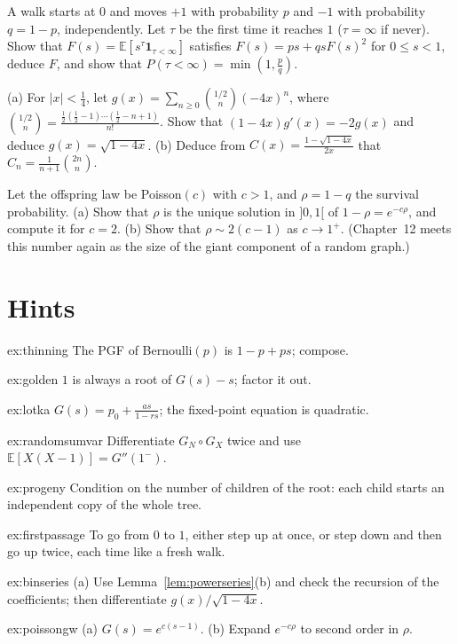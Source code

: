 \begin{exercise}[$\star\star$]\label{ex:firstpassage}
A walk starts at $0$ and moves $+1$ with probability $p$ and $-1$ with probability $q=1-p$, independently. Let $\tau$ be the
first time it reaches $1$ ($\tau=\infty$ if never). Show that $F(s)=\mathbb E[s^\tau\mathbf 1_{\tau<\infty}]$ satisfies $F(s)=ps+qsF(s)^2$ for
$0\le s<1$, deduce $F$, and show that $P(\tau<\infty)=\min(1,\frac pq)$.
\end{exercise}

\begin{exercise}[$\star\star$]\label{ex:binseries}
(a) For $|x|<\frac14$, let $g(x)=\sum_{n\ge0}\binom{1/2}n(-4x)^n$, where $\binom{1/2}n=\frac{\frac12(\frac12-1)\cdots(\frac12-n+1)}{n!}$. Show that
$(1-4x)g'(x)=-2g(x)$ and deduce $g(x)=\sqrt{1-4x}$. (b) Deduce from $C(x)=\frac{1-\sqrt{1-4x}}{2x}$ that $C_n=\frac1{n+1}\binom{2n}n$.
\end{exercise}

\begin{exercise}[$\star\star\star$]\label{ex:poissongw}
Let the offspring law be Poisson$(c)$ with $c>1$, and $\rho=1-q$ the survival probability. (a) Show that $\rho$ is the unique
solution in $]0,1[$ of $1-\rho=e^{-c\rho}$, and compute it for $c=2$. (b) Show that $\rho\sim2(c-1)$ as $c\to1^+$. (Chapter~12 meets this
number again as the size of the giant component of a random graph.)
\end{exercise}

\section{Hints}

\begin{hint}{ex:thinning}
The PGF of Bernoulli$(p)$ is $1-p+ps$; compose.
\end{hint}
\begin{hint}{ex:golden}
$1$ is always a root of $G(s)-s$; factor it out.
\end{hint}
\begin{hint}{ex:lotka}
$G(s)=p_0+\frac{as}{1-rs}$; the fixed-point equation is quadratic.
\end{hint}
\begin{hint}{ex:randomsumvar}
Differentiate $G_N\circ G_X$ twice and use $\mathbb E[X(X-1)]=G''(1^-)$.
\end{hint}
\begin{hint}{ex:progeny}
Condition on the number of children of the root: each child starts an independent copy of the whole tree.
\end{hint}
\begin{hint}{ex:firstpassage}
To go from $0$ to $1$, either step up at once, or step down and then go up twice, each time like a fresh walk.
\end{hint}
\begin{hint}{ex:binseries}
(a) Use Lemma~\ref{lem:powerseries}(b) and check the recursion of the coefficients; then differentiate $g(x)/\sqrt{1-4x}$.
\end{hint}
\begin{hint}{ex:poissongw}
(a) $G(s)=e^{c(s-1)}$. (b) Expand $e^{-c\rho}$ to second order in $\rho$.
\end{hint}

